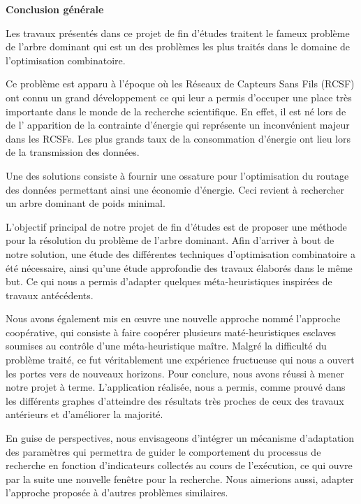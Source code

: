 

\begin{center}
	\LARGE\textbf{Conclusion générale}
\end{center}

\thispagestyle{plain}

Les travaux présentés dans ce projet de fin d’études traitent le fameux problème de l’arbre dominant qui est un des problèmes les plus traités dans le domaine de l'optimisation combinatoire.

Ce problème est apparu à l’époque où les Réseaux de Capteurs Sans Fils (RCSF) ont connu un  grand développement ce qui leur a permis d’occuper une place très importante dans le monde de la recherche scientifique.  En effet, il est né lors de de l’ apparition de la contrainte d’énergie  qui représente un inconvénient majeur dans les RCSFs. Les plus grands taux de la consommation d’énergie ont lieu lors de la transmission des données.

Une des solutions consiste à fournir une ossature pour l’optimisation du routage des données permettant ainsi une économie d’énergie. Ceci revient à rechercher un arbre dominant de poids minimal.

L’objectif principal de notre projet de fin d’études est de proposer une méthode pour la résolution du problème de l’arbre dominant. Afin d’arriver à bout de notre solution, une étude des différentes techniques d’optimisation combinatoire a été nécessaire, ainsi qu’une étude approfondie des travaux élaborés dans le même but. Ce qui nous a permis  d'adapter quelques méta-heuristiques inspirées de travaux antécédents.

Nous avons également mis en œuvre une nouvelle approche nommé l’approche coopérative, qui consiste à faire coopérer plusieurs maté-heuristiques esclaves soumises au contrôle d'une méta-heuristique maître. Malgré la difficulté du problème traité, ce fut véritablement une expérience fructueuse qui nous a ouvert les portes vers de nouveaux horizons. Pour conclure, nous avons réussi à mener notre projet à terme. L’application réalisée, nous a permis, comme prouvé dans les différents graphes d’atteindre des résultats très proches de ceux des travaux antérieurs et d’améliorer la majorité. 

En guise de perspectives, nous envisageons d’intégrer un mécanisme d’adaptation des paramètres qui permettra de guider le comportement du processus de recherche en fonction d’indicateurs collectés au cours de l’exécution, ce qui ouvre par la suite une nouvelle fenêtre pour la recherche. Nous aimerions aussi, adapter l’approche proposée à d’autres problèmes similaires.
